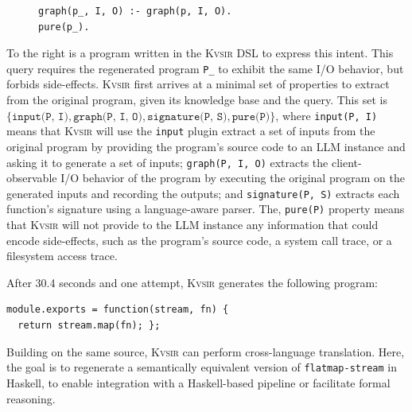 \documentclass[nonacm,sigplan,review]{acmart}
\newcommand{\sys}{{\scshape Kv{\textalpha}sir}\xspace}
\newcommand{\ttt}[1]{\texttt{#1}\xspace}
\begin{document}
\begin{figure}
\vspace{-10pt}
\hspace{-10pt}
\begin{verbatim}
graph(p_, I, O) :- graph(p, I, O).
pure(p_).
\end{verbatim}
\end{figure}
To the right is a program written in the \sys DSL to express this intent.
This query requires the regenerated program \ttt{P\_} to exhibit the same I/O behavior,
but forbids side-effects.
\sys first arrives at a minimal set of properties to extract from the
original program, given its knowledge base and the query.
This set is $\{\ttt{input(P, I)}, \ttt{graph(P, I, O)}, \ttt{signature(P, S)}, \ttt{pure(P)}\}$, where
\texttt{input(P, I)} means that \sys will use the \ttt{input} plugin extract a set of inputs from the original program
by providing the program's source code to an LLM instance and asking it to generate a set of inputs;
\texttt{graph(P, I, O)} extracts the client-observable I/O behavior of the program
by executing the original program on the generated inputs and recording the outputs;
and \texttt{signature(P, S)} extracts each function's signature using a language-aware parser.
The, \texttt{pure(P)} property means that \sys will not provide to the LLM 
instance any information that could encode side-effects, such as the
program's source code, a system call trace, or a filesystem access trace.

After 30.4 seconds and one attempt, \sys generates the following program:
\begin{verbatim}
module.exports = function(stream, fn) {
  return stream.map(fn); };
\end{verbatim}

Building on the same source, \sys can perform cross-language
translation. 
Here, the goal is to regenerate a semantically equivalent version
of \texttt{flatmap-stream} in Haskell, to enable integration with a
Haskell-based pipeline or facilitate formal reasoning.
\end{document}
